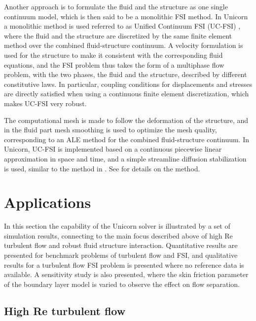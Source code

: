 Another approach is to formulate the fluid and the structure as one single continuum model, which is then said to be a monolithic FSI method. In Unicorn a monolithic method is used referred to as Unified Continuum FSI (UC-FSI) \cite{HoffmanJanssonEtAl2009}, where the fluid and the structure are discretized by the same finite element method over the combined fluid-structure continuum. A velocity formulation is used for the structure to make it consistent with the corresponding fluid equations, and the FSI problem thus takes the form of a multiphase flow problem, with the two phases, the fluid and the structure, described by different constitutive laws. In particular, coupling conditions for displacements and stresses are directly satisfied when using a continuous finite element discretization, which makes UC-FSI very robust.

The computational mesh is made to follow the deformation of the structure, and in the fluid part mesh smoothing is used to optimize the mesh quality, corresponding to an ALE method for the combined fluid-structure continuum.
In Unicorn, UC-FSI is implemented based on a continuous piecewise linear approximation in space and time, and a simple streamline diffusion stabilization is used, similar to the method in \cite{Hansbo2000}.
See \cite{HoffmanJanssonEtAl2009} for details on the method.


\section{Applications}

In this section the capability of the Unicorn solver is illustrated by a set of simulation results, connecting to the main focus described above of high Re turbulent flow and robust fluid structure interaction. Quantitative results are presented for benchmark problems of turbulent flow and FSI, and qualitative results for a turbulent flow FSI problem is presented where no reference data is available. A sensitivity study is also presented, where the skin friction parameter of the boundary layer model is varied to observe the effect on flow separation.

\subsection{High Re turbulent flow}

